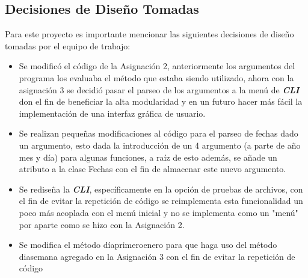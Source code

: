 \documentclass[10pt,journal,compsoc]{IEEEtran}
\begin{document}
\subsection{Decisiones de Diseño Tomadas}
	\par Para este proyecto es importante mencionar las siguientes decisiones de diseño tomadas por el equipo de trabajo:
	\begin{itemize}
		\item Se modificó el código de la Asignación 2, anteriormente los argumentos del programa los evaluaba el método que estaba siendo utilizado, ahora con la asignación 3 se decidió pasar el parseo de los argumentos a la menú de \textit{\textbf{CLI}} don el fin de beneficiar la alta modularidad y en un futuro hacer más fácil la implementación de una interfaz gráfica de usuario.
		\item Se realizan pequeñas modificaciones al código para el parseo de fechas dado un argumento, esto dada la introducción de un 4 argumento (a parte de año mes y día) para algunas funciones, a raíz de esto además, se añade un atributo a la clase Fechas con el fin de almacenar este nuevo argumento.
		\item Se rediseña la \textbf{\textit{CLI}}, específicamente en la opción de pruebas de archivos, con el fin de evitar la repetición de código se reimplementa esta funcionalidad un poco más acoplada con el menú inicial y no se implementa como un "menú" por aparte como se hizo con la Asignación 2.
		\item Se modifica el método día\textunderscore primero\textunderscore enero para que haga uso del método dia\textunderscore semana agregado en la Asignación 3 con el fin de evitar la repetición de código
	\end{itemize}
\end{document}
